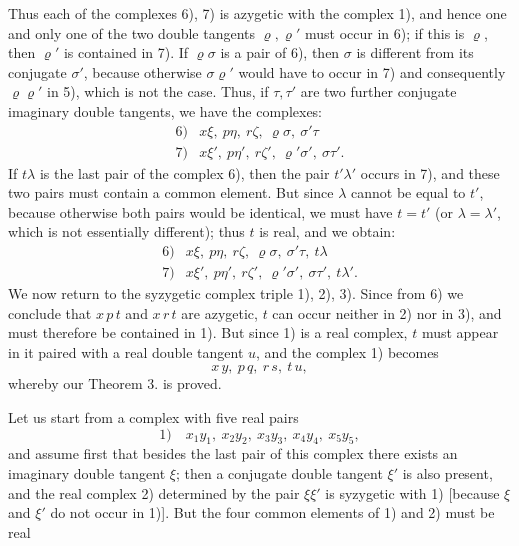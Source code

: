 Thus each of the complexes 6), 7) is azygetic with the complex 1),
and hence one and only one of the two double tangents
$\varrho, \varrho'$ must occur in 6); if this is $\varrho$, then $\varrho'$ is contained in
7). If $\varrho\sigma$ is a pair of 6), then $\sigma$ is different from its
conjugate $\sigma'$, because otherwise $\sigma\varrho'$ would have to occur in 7) and consequently
$\varrho\varrho'$ in 5), which is not the case. Thus, if $\tau, \tau'$ are two further conjugate imaginary double tangents,
we have the complexes:
\[
\begin{array}{rl}
6) & x\xi,\ p\eta,\ r\zeta,\ \varrho\sigma,\ \sigma'\tau \\
7) & x\xi',\ p\eta',\ r\zeta',\ \varrho'\sigma',\ \sigma\tau'.
\end{array}
\]
If $t\lambda$ is the last pair of the complex 6), then the pair
$t'\lambda'$ occurs in 7), and these two pairs must contain a common
element. But since $\lambda$ cannot be equal to $t'$, because otherwise
both pairs would be identical, we must have $t = t'$ (or $\lambda = \lambda'$, which
is not essentially different); thus $t$ is real, and we
obtain:
\[
\begin{array}{rl}
6) & x\xi,\ p\eta,\ r\zeta,\ \varrho\sigma,\ \sigma'\tau,\ t\lambda \\
7) & x\xi',\ p\eta',\ r\zeta',\ \varrho'\sigma',\ \sigma\tau',\ t\lambda'.
\end{array}
\]
We now return to the syzygetic complex triple 1), 2), 3).
Since from 6) we conclude that $x\,p\,t$ and $x\,r\,t$ are azygetic,
$t$ can occur neither in 2) nor in 3), and must therefore be
contained in 1). But since 1) is a real complex, $t$ must appear in it
paired with a real double tangent $u$, and the
complex 1) becomes
\[
x\,y,\ p\,q,\ r\,s,\ t\,u,
\]
whereby our Theorem 3. is proved.


Let us start from a complex with five real pairs
\[
1)\quad x_1y_1,\ x_2y_2,\ x_3y_3,\ x_4y_4,\ x_5y_5,
\]
and assume first that besides the last pair of this
complex there exists an imaginary double tangent $\xi$; then
a conjugate double tangent $\xi'$ is also present, and the real complex 2) determined by the
pair $\xi\xi'$ is syzygetic with 1) [because
$\xi$ and $\xi'$ do not occur in 1)]. But the four common
elements of 1) and 2) must be real
